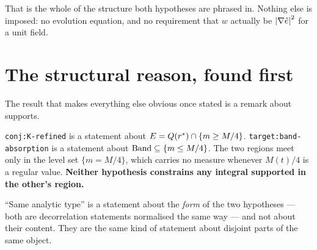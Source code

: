 That is the whole of the structure both hypotheses are phrased in. Nothing
else is imposed: no evolution equation, and no requirement that \(w\) actually
be \(\left|\nabla\hat{e}\right|^2\) for a unit field.

\section{The structural reason, found first}
\label{sec:disjoint}

The result that makes everything else obvious once stated is a remark about
supports.

\begin{statement}
\label{st:disjoint}
\texttt{conj:K-refined} is a statement about \(E=Q(r^{*})\cap\{m\ge M/4\}\).
\texttt{target:band-absorption} is a statement about
\(\mathrm{Band}\subseteq\{m\le M/4\}\). The two regions meet only in the level set
\(\{m=M/4\}\), which carries no measure whenever \(M(t)/4\) is a regular
value. \textbf{Neither hypothesis constrains any integral supported in the
other's region.}
\end{statement}

``Same analytic type'' is a statement about the \emph{form} of the two
hypotheses --- both are decorrelation statements normalised the same way ---
and not about their content. They are the same kind of statement about
disjoint parts of the same object.

